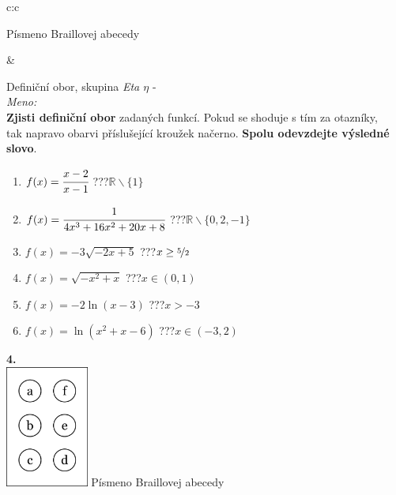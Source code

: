\documentclass[10pt]{report}
\begin{document}
\begin{tabular}{c:c}
\begin{minipage}[c][99mm][t]{0.49\linewidth}
\begin{center}
\begin{minipage}{0.20\linewidth}
\begin{center}
{\small Písmeno Braillovej abecedy}
\end{center}
\end{minipage}
\end{center}
\end{minipage}
&
\begin{minipage}[c][99mm][t]{0.49\linewidth}
\begin{center}
\vspace{7mm}
{\huge Definiční obor, skupina \textit{Eta $\eta$} -}\\[4.5mm]
\textit{Meno:}\phantom{xxxxxxxxxxxxxxxxxxxxxxxxxxxxxxxxxxxxxxxxxxxxxxxxxxxxxxxxxxxxxxxxx}\\[3.5mm]
\textbf{Zjisti definiční obor} zadaných funkcí. Pokud se shoduje s tím za otazníky,\\tak napravo obarvi příslušející kroužek načerno. \textbf{Spolu odevzdejte výsledné slovo}.\\[3mm]
\begin{minipage}{0.77\linewidth}
\begin{center}
\begin{varwidth}{\textwidth}
\begin{enumerate}
\normalsize
\item $f(x)=\cfrac{x-2}{x-1}$\quad \dotfill\; ???\;\dotfill \quad $\mathbb{R}\smallsetminus\{1\}$
\item $f(x)=\cfrac{1}{4x^3+16x^2+20x+8}$\quad \dotfill\; ???\;\dotfill \quad $\mathbb{R}\smallsetminus\{0,2,-1\}$
\item $f(x)=-3\sqrt{-2x+5}$\quad \dotfill\; ???\;\dotfill \quad $x\geq\nicefrac{5}{2}$
\item $f(x)=\sqrt{-x^2+x}$\quad \dotfill\; ???\;\dotfill \quad $x\in(0 , 1)$
\item $f(x)=-2\ln{(x-3)}$\quad \dotfill\; ???\;\dotfill \quad $x>-3$
\item $f(x)=\ln{(x^2+x-6)}$\quad \dotfill\; ???\;\dotfill \quad $x\in(-3 , 2)$
\end{enumerate}
\end{varwidth}
\end{center}
\end{minipage}
\begin{minipage}{0.20\linewidth}
\begin{center}
{\Huge\bfseries 4.} \\[2mm]
\includegraphics[height=40mm]{../images/braille.png}
{\small Písmeno Braillovej abecedy}
\end{center}
\end{minipage}
\end{center}
\end{minipage}
%
\end{tabular}
\end{document}
